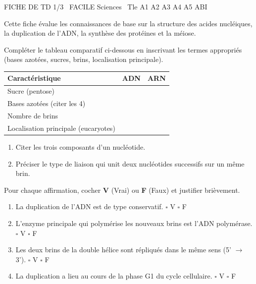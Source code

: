 \documentclass[11pt]{article}
\begin{document}
\begin{tcolorbox}[enhanced,colback=popink,colframe=popink,arc=10pt,boxrule=0pt,left=12pt,right=12pt,top=9pt,bottom=9pt]
{\color{white}\popxbold\small FICHE DE TD 1/3 \textbullet\ FACILE \hfill Sciences \textbullet\ Tle A1 A2 A3 A4 A5 ABI\par}
\end{tcolorbox}
\vspace{4pt}
Cette fiche évalue les connaissances de base sur la structure des acides nucléiques, la duplication de l'ADN, la synthèse des protéines et la méiose.

\begin{exercice}
Compléter le tableau comparatif ci-dessous en inscrivant les termes appropriés (bases azotées, sucres, brins, localisation principale).
\begin{center}
\begin{tabularx}{\linewidth}{|X|c|c|}
\hline
\textbf{Caractéristique} & \textbf{ADN} & \textbf{ARN} \\
\hline
Sucre (pentose) & & \\
\hline
Bases azotées (citer les 4) & & \\
\hline
Nombre de brins & & \\
\hline
Localisation principale (eucaryotes) & & \\
\hline
\end{tabularx}
\end{center}
\begin{enumerate}
\item Citer les trois composants d'un nucléotide.
\item Préciser le type de liaison qui unit deux nucléotides successifs sur un même brin.
\end{enumerate}
\end{exercice}

\begin{exercice}
Pour chaque affirmation, cocher \textbf{V} (Vrai) ou \textbf{F} (Faux) et justifier brièvement.
\begin{enumerate}
\item La duplication de l'ADN est de type conservatif. \hfill $\square$ V \quad $\square$ F
\item L'enzyme principale qui polymérise les nouveaux brins est l'ADN polymérase. \hfill $\square$ V \quad $\square$ F
\item Les deux brins de la double hélice sont répliqués dans le même sens (5' $\to$ 3'). \hfill $\square$ V \quad $\square$ F
\item La duplication a lieu au cours de la phase G1 du cycle cellulaire. \hfill $\square$ V \quad $\square$ F
\end{enumerate}
\end{exercice}
\end{document}
